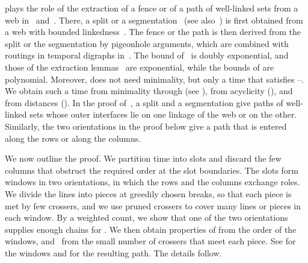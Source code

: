 \documentclass[fontsize=12pt,leading=14pt]{fullpaper}
\begin{document}
 plays the role of the extraction of a fence or of a path of well-linked sets from a web in~\cite[Section~5]{KawarabayashiK15} and~\cite[sections~5 and~9]{HKMM26a}.
There, a split or a segmentation~\cite[Lemma~5.15]{KawarabayashiK15} (see also~\cite[Lemma~5.2]{HKMM26a}) is first obtained from a web with bounded linkedness~\cite[Definition~5.13]{KawarabayashiK15}.
The fence or the path is then derived from the split or the segmentation by pigeonhole arguments, which are combined with routings in temporal digraphs in~\cite[Section~9]{HKMM26a}.
The bound of~\cite[Lemma~5.2]{HKMM26a} is doubly exponential, and those of the extraction lemmas~\cite[lemmas~9.2, 9.4 and~9.7]{HKMM26a} are exponential, while the bounds of  are polynomial.
Moreover,  does not need minimality, but only a time that satisfies --.
We obtain such a time from minimality through  (see ), from acyclicity (), and from distances ().
In the proof of~\cite[Theorem~9.9]{HKMM26a}, a split and a segmentation give paths of well-linked sets whose outer interfaces lie on one linkage of the web or on the other.
Similarly, the two orientations in the proof below give a path that is entered along the rows or along the columns.

We now outline the proof.
We partition time into slots and discard the few columns that obstruct the required order at the slot boundaries.
The slots form windows in two orientations, in which the rows and the columns exchange roles.
We divide the lines into pieces at greedily chosen breaks, so that each piece is met by few crossers, and we use pruned crossers to cover many lines or pieces in each window.
By a weighted count, we show that one of the two orientations supplies enough chains for .
We then obtain properties  of  from the order of the windows, and~ from the small number of crossers that meet each piece.
See  for the windows and for the resulting path.
The details follow.
\end{document}
